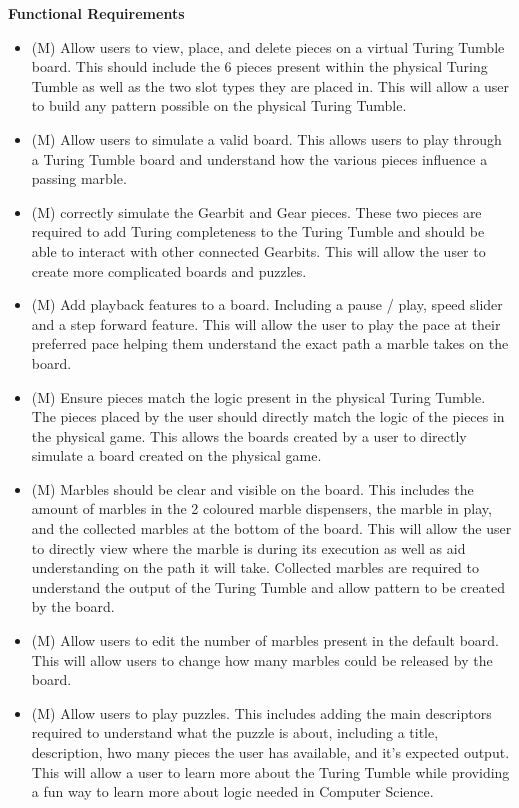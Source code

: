 \documentclass{l4proj}
\begin{document}
\textbf{Functional Requirements}
\begin{itemize}
    \item (M) Allow users to view, place, and delete pieces on a virtual Turing Tumble board. This should include the 6 pieces present within the physical Turing Tumble as well as the two slot types they are placed in. This will allow a user to build any pattern possible on the physical Turing Tumble.
    \item (M) Allow users to simulate a valid board. This allows users to play through a Turing Tumble board and understand how the various pieces influence a passing marble.
    \item (M) correctly simulate the Gearbit and Gear pieces. These two pieces are required to add Turing completeness to the Turing Tumble and should be able to interact with other connected Gearbits. This will allow the user to create more complicated boards and puzzles.
    \item (M) Add playback features to a board. Including a pause / play, speed slider and a step forward feature. This will allow the user to play the pace at their preferred pace helping them understand the exact path a marble takes on the board.
    \item (M) Ensure pieces match the logic present in the physical Turing Tumble. The pieces placed by the user should directly match the logic of the pieces in the physical game. This allows the boards created by a user to directly simulate a board created on the physical game.
    \item (M) Marbles should be clear and visible on the board. This includes the amount of marbles in the 2 coloured marble dispensers, the marble in play, and the collected marbles at the bottom of the board. This will allow the user to directly view where the marble is during its execution as well as aid understanding on the path it will take. Collected marbles are required to understand the output of the Turing Tumble and allow pattern to be created by the board.
    \item (M) Allow users to edit the number of marbles present in the default board. This will allow users to change how many marbles could be released by the board.
    \item (M) Allow users to play puzzles. This includes adding the main descriptors required to understand what the puzzle is about, including a title, description, hwo many pieces the user has available, and it's expected output. This will allow a user to learn more about the Turing Tumble while providing a fun way to learn more about logic needed in Computer Science.

\end{itemize}
\end{document}
